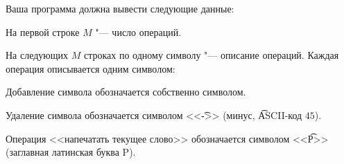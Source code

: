 Ваша программа должна вывести следующие данные:

\begin{shortitems}
  \item На первой строке $M$ "--- число операций.
  \item На следующих $M$ строках по одному символу "--- описание операций.
    Каждая операция описывается одним символом:

    \begin{shortitems}
      \item Добавление символа обозначается собственно символом.
      \item Удаление символа обозначается символом <<\t{-}>>
        (минус, \t{ASCII}-код $45$).
      \item Операция <<напечатать текущее слово>> обозначается символом
        <<\t{P}>> (заглавная латинская буква P).
   \end{shortitems}

\end{shortitems}
